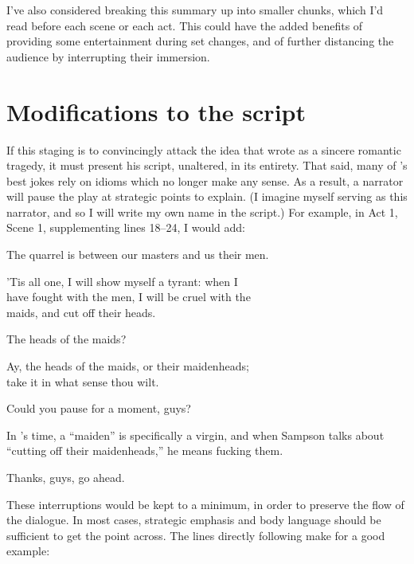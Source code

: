 I've also considered breaking this summary up into smaller chunks, which I'd read before
each scene or each act. This could have the added benefits of providing some entertainment
during set changes, and of further distancing the audience by interrupting their
immersion.

\section*{Modifications to the script}

If this staging is to convincingly attack the idea that \billy{} wrote \theplay{} as a
sincere romantic tragedy, it must present his script, unaltered, in its entirety. That
said, many of \billy{}'s best jokes rely on idioms which no longer make any sense. As a
result, a narrator will pause the play at strategic points to explain. (I imagine myself
serving as this narrator, and so I will write my own name in the script.) For example, in
Act 1, Scene 1, supplementing lines 18--24, I would add:

\begin{dialogue}
   The quarrel is between our masters and us their men.

   'Tis all one, I will show myself a tyrant: when I \\
  have fought with the men, I will be cruel with the \\
  maids, and cut off their heads.

   The heads of the maids?

   Ay, the heads of the maids, or their maidenheads; \\
  take it in what sense thou wilt.

    Could you pause for a moment, guys?
  
   In \billy{}'s time, a \enquote{maiden} is specifically a virgin,
  and when Sampson talks about \enquote{cutting off their maidenheads,} he means fucking
  them.
  
  
   Thanks, guys, go ahead. 
\end{dialogue}

These interruptions would be kept to a minimum, in order to preserve the flow of the
dialogue. In most cases, strategic emphasis and body language should be sufficient to get
the point across. The lines directly following make for a good example:

